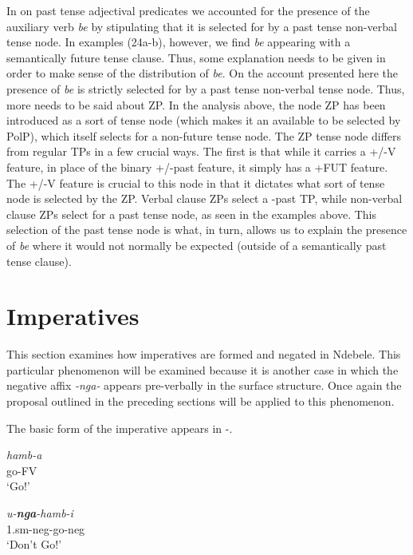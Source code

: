 \documentclass[output=paper]{langsci/langscibook}
\newcommand{\nga}[0]{\textit{-nga- }}
\newcommand{\bee}[0]{\textit{be }}
\begin{document}
In  on past tense adjectival predicates we accounted for the presence of the auxiliary verb \bee by stipulating that it is selected for by a past tense non-verbal tense node. In  examples (24a-b), however, we find \bee appearing with a semantically future tense clause. Thus, some explanation needs to be given in order to make sense of the distribution of \textit{be}. On the account presented here the presence of \bee is strictly selected for by a past tense non-verbal tense node. Thus, more needs to be said about ZP.
In the analysis above, the node ZP has been introduced as a sort of tense node (which makes it an available to be selected by PolP), which itself selects for a non-future tense node. The ZP tense node differs from regular TPs in a few crucial ways. The first is that while it carries a +/-V feature, in place of the binary +/-past feature, it simply has a +FUT feature. The +/-V feature is crucial to this node in that it dictates what sort of tense node is selected by the ZP. Verbal clause ZPs select a -past TP, while non-verbal clause ZPs select for a past tense node, as seen in the examples above. This selection of the past tense node is what, in turn, allows us to explain the presence of \bee where it would not normally be expected (outside of a semantically past tense clause). 



\section{Imperatives}\label{sec:burkholder:4}

This section examines how imperatives are formed and negated in Ndebele. This particular phenomenon will be examined because it is another case in which the negative affix \nga appears pre-verbally in the surface structure. Once again the proposal outlined in the preceding sections will be applied to this phenomenon.

The basic form of the imperative appears in -.


\begin{exe}
\ex\label{ex:burkholder:27} \begin{xlist}
\ex\label{ex:burkholder:27a} \gll \textit{hamb-a}\\
        go-FV\\
    \glt `Go!'

\ex\label{ex:burkholder:27b} \gll \textit{u-\textbf{nga}-hamb-i}\\
        1.{\sc sm}-{\sc neg}-go-{\sc neg}\\
    \glt `Don't Go!'
\end{xlist}
\end{exe}
\end{document}
